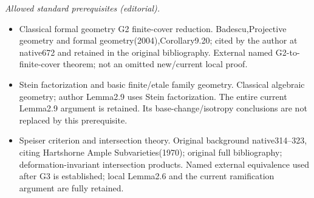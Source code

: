 \documentclass[10pt,a4paper]{article}
\numberwithin{equation}{section}
\theoremstyle{definition}
\theoremstyle{remark}
\begin{document}
\noindent\textit{Allowed standard prerequisites (editorial).}\begin{itemize}
\item Classical formal geometry G2 finite-cover reduction. Badescu,Projective geometry and formal geometry(2004),Corollary9.20; cited by the author at native672 and retained in the original bibliography. External named G2-to-finite-cover theorem; not an omitted new/current local proof.
\item Stein factorization and basic finite/etale family geometry. Classical algebraic geometry; author Lemma2.9 uses Stein factorization. The entire current Lemma2.9 argument is retained. Its base-change/isotropy conclusions are not replaced by this prerequisite.
\item Speiser criterion and intersection theory. Original background native314–323, citing Hartshorne Ample Subvarieties(1970); original full bibliography; deformation-invariant intersection products. Named external equivalence used after G3 is established; local Lemma2.6 and the current ramification argument are fully retained.
\end{itemize}\medskip
\end{document}

